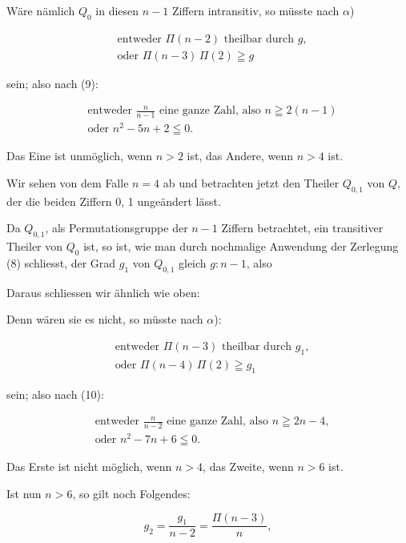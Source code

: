 Wäre nämlich $Q_0$ in diesen $n-1$ Ziffern intransitiv, so müsste nach $\alpha$)

\[
\begin{aligned}
&\text{entweder } \Pi(n-2) \text{ theilbar durch } g,\\
&\text{oder } \Pi(n-3)\,\Pi(2) \geqq g
\end{aligned}
\]

sein; also nach (9):

\[
\begin{aligned}
&\text{entweder } \frac{n}{n-1} \text{ eine ganze Zahl, also } n \geqq 2(n-1)\\
&\text{oder } n^2 - 5n + 2 \leqq 0.
\end{aligned}
\]

Das Eine ist unmöglich, wenn $n > 2$ ist, das Andere, wenn $n > 4$ ist.

Wir sehen von dem Falle $n = 4$ ab und betrachten jetzt den Theiler $Q_{0,1}$ von
$Q$, der die beiden Ziffern 0, 1 ungeändert lässt.

Da $Q_{0,1}$, als Permutationsgruppe der $n-1$ Ziffern betrachtet, ein transitiver
Theiler von $Q_0$ ist, so ist, wie man durch nochmalige Anwendung der Zerlegung (8)
schliesst, der Grad $g_1$ von $Q_{0,1}$ gleich $g : n-1$, also


Daraus schliessen wir ähnlich wie oben:


Denn wären sie es nicht, so müsste nach $\alpha$):

\[
\begin{aligned}
&\text{entweder } \Pi(n-3) \text{ theilbar durch } g_1,\\
&\text{oder } \Pi(n-4)\,\Pi(2) \geqq g_1
\end{aligned}
\]

sein; also nach (10):

\[
\begin{aligned}
&\text{entweder } \frac{n}{n-2} \text{ eine ganze Zahl, also } n \geqq 2n - 4,\\
&\text{oder } n^2 - 7n + 6 \leqq 0.
\end{aligned}
\]

Das Erste ist nicht möglich, wenn $n > 4$, das Zweite, wenn $n > 6$ ist.

Ist nun $n > 6$, so gilt noch Folgendes:


\[ g_2 = \frac{g_1}{n-2} = \frac{\Pi(n-3)}{n}, \]

